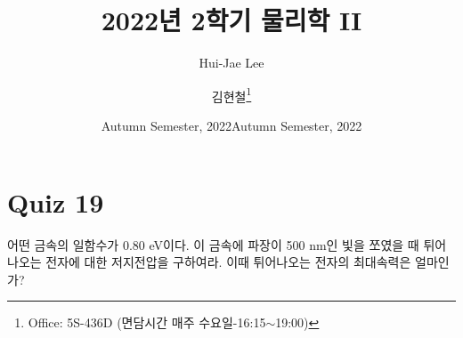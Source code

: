 \documentclass[tightenlines,floatfix,nofootinbib,superscriptaddress,fleqn]{revtex4}
\begin{document}
\title{\Large 2022년 2학기 물리학 II}
\author{Hui-Jae Lee} 
\date{Autumn Semester, 2022}
\author{김현철\footnote{Office: 5S-436D (면담시간 매주
    수요일-16:15$\sim$19:00)}} 
\date{Autumn Semester, 2022}
\maketitle


\section*{\large Quiz 19}
어떤 금속의 일함수가 0.80 eV이다. 이 금속에 파장이 500 nm인 빛을
쪼였을 때 튀어나오는 전자에 대한 저지전압을 구하여라. 이때 튀어나오는
전자의 최대속력은 얼마인가? 
\end{document}
